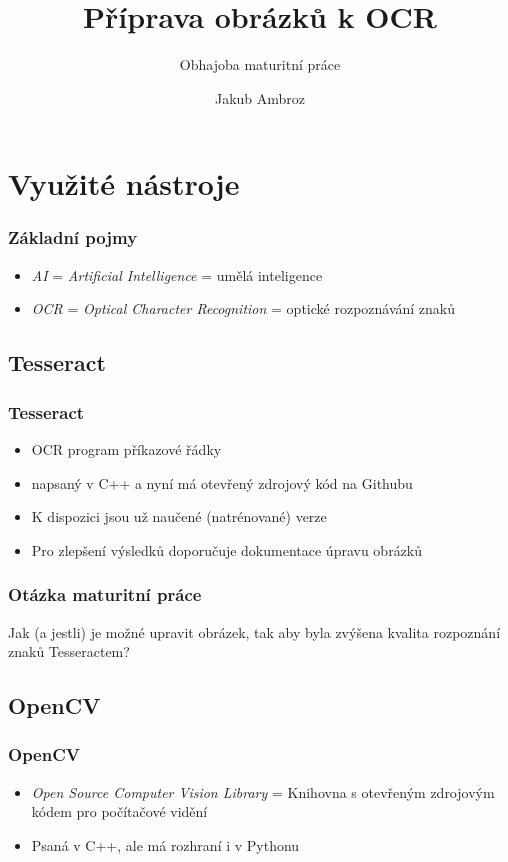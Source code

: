 \documentclass{beamer}
\title{Příprava obrázků k OCR}
\subtitle{Obhajoba maturitní práce}
\author{Jakub Ambroz}
\begin{document}
	\begin{frame}
		\titlepage
	\end{frame}
\section{Využité nástroje}	
\begin{frame}
\frametitle{Základní pojmy}
\begin{itemize}
\item \emph{AI} = \emph{Artificial Intelligence} = umělá inteligence
\item \emph{OCR} = \emph{Optical Character Recognition} = optické rozpoznávání znaků
\end{itemize}
\end{frame}
\subsection{Tesseract}
\begin{frame}
\frametitle{Tesseract}
\begin{itemize}
\item OCR program příkazové řádky
\item napsaný v C++ a nyní má otevřený zdrojový kód na Githubu
\item K dispozici jsou už naučené (natrénované) verze
\item Pro zlepšení výsledků doporučuje dokumentace úpravu obrázků
\end{itemize}
\end{frame}
\begin{frame}
\frametitle{Otázka maturitní práce}
\begin{huge}
Jak (a jestli) je možné upravit obrázek, tak aby byla zvýšena kvalita rozpoznání znaků Tesseractem?
\end{huge}
\end{frame}
\subsection{OpenCV}
\begin{frame}
\frametitle{OpenCV}
\begin{itemize}
\item \emph{Open Source Computer Vision Library} = Knihovna s otevřeným zdrojovým kódem pro počítačové vidění
\item Psaná v C++, ale má rozhraní i v Pythonu
\end{itemize}
\end{frame}	
\end{document}
